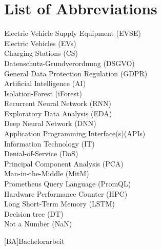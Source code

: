 \lhead{}

\section{List of Abbreviations}

Electric Vehicle Supply Equipment (EVSE)\\
Electric Vehicles (EVs)\\
Charging Stations (CS)\\
Datenschutz-Grundverordnung (DSGVO)\\
General Data Protection Regulation (GDPR)\\
Artificial Intelligence (AI)\\
Isolation-Forest (iForest)\\
Recurrent Neural Network (RNN)\\
Exploratory Data Analysis (EDA)\\
Deep Neural Network (DNN)\\
Application Programming Interface(s)(APIs)\\
Information Technology (IT)\\
Denial-of-Service (DoS)\\
Principal Component Analysis (PCA)\\
Man-in-the-Middle (MitM)\\
Prometheus Query Language (PromQL)\\
Hardware Performance Counter (HPC)\\
Long Short-Term Memory (LSTM) \\
Decision tree (DT)\\
Not a Number (NaN)\\

\begin{acronym}[KDE]
[BA]{Bachelorarbeit}
\end{acronym}
\pagebreak